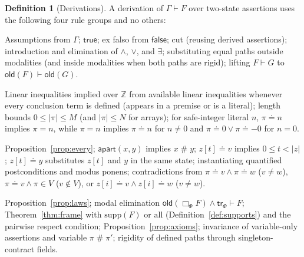 \documentclass[10pt,a4paper]{article}
\theoremstyle{definition}
\newtheorem{definition}[theorem]{Definition}
\theoremstyle{remark}
\newcommand{\bx}[1]{\Box_{#1}}
\newcommand{\sep}{\mathrel{\#}}
\newcommand{\kw}[1]{\mathsf{#1}}
\newcommand{\old}{\kw{old}}
\newcommand{\apart}{\kw{apart}}
\newcommand{\len}[1]{|#1|}
\begin{document}
\begin{definition}[Derivations]\label{def:deriv}
A derivation of $\Gamma\vdash F$ over two-state assertions uses the
following four rule groups and no others:
\begin{description}[leftmargin=1.5em,style=nextline,itemsep=1pt,topsep=2pt]
\item[Logic] Assumptions from $\Gamma$; $\kw{true}$; ex falso from
$\kw{false}$; cut (reusing derived assertions); introduction and
elimination of $\wedge$, $\vee$, and $\exists$; substituting equal paths
outside modalities (and inside modalities when both paths are rigid);
lifting $F\vdash G$ to $\old(F)\vdash\old(G)$.
\item[Arithmetic] Linear inequalities implied over $\mathbb{Z}$ from
available linear inequalities whenever every conclusion term is defined
(appears in a premise or is a literal); length bounds $0\le\len\pi\le M$
(and $\len\pi\le N$ for arrays); for safe-integer literal $n$,
$\pi\doteq n$ implies $\pi=n$, while $\pi=n$ implies $\pi\doteq n$ for
$n\ne 0$ and $\pi\doteq 0\vee\pi\doteq -0$ for $n=0$.
\item[Atoms] Proposition~\ref{prop:every}; $\apart(x,y)$ implies
$x\sep y$; $z[t]\doteq v$ implies $0\le t<\len z$; $z[t]\doteq y$
substitutes $z[t]$ and $y$ in the same state; instantiating quantified
postconditions and modus ponens; contradictions from
$\pi\doteq v\wedge\pi\doteq w$ ($v\ne w$), $\pi\doteq v\wedge\pi\in V$
($v\notin V$), or $z[i]\doteq v\wedge z[i]\doteq w$ ($v\ne w$).
\item[Modality] Proposition~\ref{prop:laws}; modal elimination
$\old(\bx{\Phi}F)\wedge\kw{tr}_\Phi\vdash F$; Theorem~\ref{thm:frame}
with $\mathrm{supp}(F)$ or $\mathrm{all}$ (Definition~\ref{def:supports})
and the pairwise respect condition; Proposition~\ref{prop:axioms};
invariance of variable-only assertions and variable $\pi\sep\pi'$;
rigidity of defined paths through singleton-contract fields.
\end{description}
\end{definition}
\end{document}
